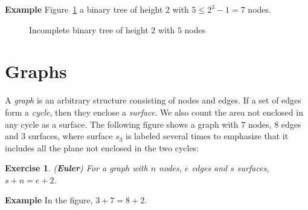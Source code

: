 \documentclass[11pt,a4paper]{report}
\newtheorem{exercise}{Exercise}
\begin{document}
\textbf{Example} Figure~\ref{fig.incomplete} a binary tree of height $2$ with $5 \leq 2^3-1=7$ nodes.

\begin{figure}[t]
\begin{center}
\caption{Incomplete binary tree of height $2$ with $5$ nodes}\label{fig.incomplete}
\end{center}
\end{figure}

\section{Graphs}

A \emph{graph} is an arbitrary structure consisting of nodes and edges. If a set of edges form a \emph{cycle}, then they enclose a \emph{surface}. We also count the area not enclosed in any cycle as a surface. %
The following figure shows a graph with $7$ nodes, $8$ edges and $3$ surfaces, where surface $s_3$ is labeled several times to emphasize that it includes all the plane not enclosed in the two cycles:

\begin{center}
\end{center}

\begin{exercise} (\textbf{Euler})
For a graph with $n$ nodes, $e$ edges and $s$ surfaces, $s+n=e+2$.
\end{exercise}
\textbf{Example} In the figure, $3+7=8+2$.
\end{document}

